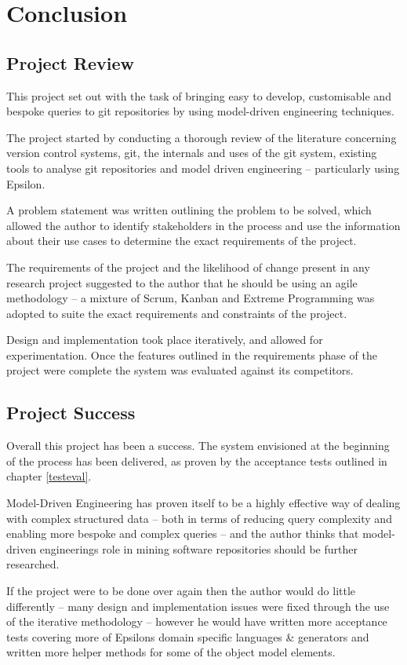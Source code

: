 \documentclass[11pt]{book}
\begin{document}
\chapter{Conclusion}
\section{Project Review}
This project set out with the task of bringing easy to develop, customisable and bespoke queries to git repositories by using model-driven engineering techniques. 

The project started by conducting a thorough review of the literature concerning version control systems, git, the internals and uses of the git system, existing tools to analyse git repositories and model driven engineering -- particularly using Epsilon.

A problem statement was written outlining the problem to be solved, which allowed the author to identify stakeholders in the process and use the information about their use cases to determine the exact requirements of the project.

The requirements of the project and the likelihood of change present in any research project suggested to the author that he should be using an agile methodology -- a mixture of Scrum, Kanban and Extreme Programming was adopted to suite the exact requirements and constraints of the project.

Design and implementation took place iteratively, and allowed for experimentation. Once the features outlined in the requirements phase of the project were complete the system was evaluated against its competitors.

\section{Project Success}
Overall this project has been a success. The system envisioned at the beginning of the process has been delivered, as proven by the acceptance tests outlined in chapter \ref{testeval}.

Model-Driven Engineering has proven itself to be a highly effective way of dealing with complex structured data -- both in terms of reducing query complexity and enabling more bespoke and complex queries -- and the author thinks that model-driven engineerings role in mining software repositories should be further researched.

If the project were to be done over again then the author would do little differently -- many design and implementation issues were fixed through the use of the iterative methodology -- however he would have written more acceptance tests covering more of Epsilons domain specific languages \& generators and written more helper methods for some of the object model elements.
\end{document}
